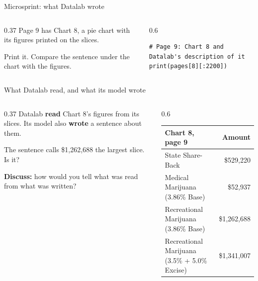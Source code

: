 \documentclass[9pt,aspectratio=169]{beamer}
\begin{document}
\begin{frame}[fragile]{Microsprint: what Datalab wrote}
    \begin{columns}[T]
        \begin{column}{0.37\textwidth}
            Page 9 has Chart 8, a pie chart with its figures printed on the slices.

            \medskip
            Print it. Compare the sentence under the chart with the figures.
        \end{column}
        \begin{column}{0.6\textwidth}
\begin{lstlisting}
# Page 9: Chart 8 and Datalab's description of it
print(pages[8][:2200])
\end{lstlisting}
        \end{column}
    \end{columns}
\end{frame}

\begin{frame}{What Datalab read, and what its model wrote}
    \begin{columns}[T]
        \begin{column}{0.37\textwidth}
            Datalab \textbf{read} Chart 8's figures from its slices. Its model also \textbf{wrote} a sentence about them.

            \medskip
            The sentence calls \$1,262,688 the largest slice. Is it?

            \medskip
            \textbf{Discuss:} how would you tell what was read from what was written?
        \end{column}
        \begin{column}{0.6\textwidth}
            {\footnotesize
            \begin{tabular}{@{}lr@{}}
                \toprule
                \textbf{Chart 8, page 9} & \textbf{Amount} \\
                \midrule
                State Share-Back & \$529,220 \\
                Medical Marijuana (3.86\% Base) & \$52,937 \\
                Recreational Marijuana (3.86\% Base) & \$1,262,688 \\
                Recreational Marijuana (3.5\% + 5.0\% Excise) & \$1,341,007 \\
                \bottomrule
            \end{tabular}\par}
        \end{column}
    \end{columns}
\end{frame}
\end{document}
